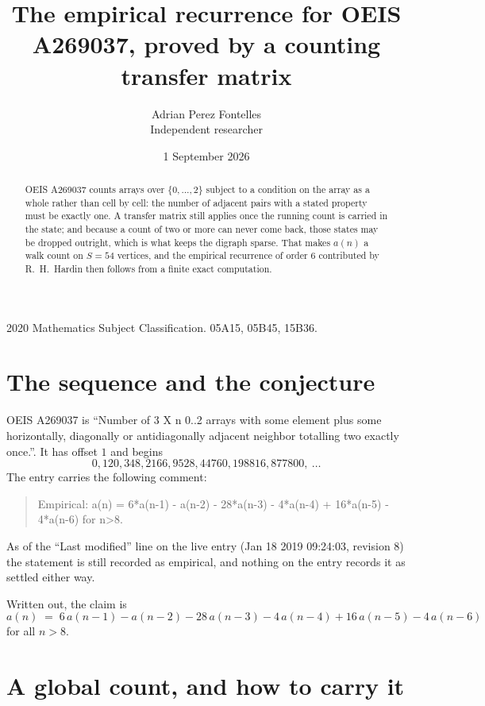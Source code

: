 \documentclass[11pt,a4paper]{article}
\title{The empirical recurrence for OEIS A269037, proved by a counting transfer matrix}
\author{Adrian Perez Fontelles\\ \small Independent researcher}
\date{1 September 2026}
\theoremstyle{plain}
\theoremstyle{definition}
\begin{document}
\maketitle

\begin{abstract}
OEIS A269037 counts arrays over $\{0,\dots,2\}$ subject to a condition on the array as a
whole rather than cell by cell: the number of adjacent pairs with a stated property must be
exactly one. A transfer matrix still applies once the running count is carried in the state; and
because a count of two or more can never come back, those states may be dropped outright,
which is what keeps the digraph sparse. That makes $a(n)$ a walk count on $S=54$ vertices,
and the empirical recurrence of order $6$ contributed by R.~H.~Hardin then follows from
a finite exact computation.
\end{abstract}

\noindent\small 2020 Mathematics Subject Classification. 05A15, 05B45, 15B36.\normalsize

\section{The sequence and the conjecture}

OEIS A269037 is ``Number of 3 X n 0..2 arrays with some element plus some horizontally, diagonally or antidiagonally adjacent neighbor totalling two exactly once.''. It has offset $1$ and begins
\[
0, 120, 348, 2166, 9528, 44760, 198816, 877800,\ \dots
\]
The entry carries the following comment:
\begin{quote}\small
Empirical: a(n) = 6*a(n-1) - a(n-2) - 28*a(n-3) - 4*a(n-4) + 16*a(n-5) - 4*a(n-6) for n>8.
\end{quote}
As of the ``Last modified'' line on the live entry (Jan 18 2019 09:24:03, revision 8) the statement is
still recorded as empirical, and nothing on the entry records it as settled either way.

Written out, the claim is
\begin{equation}\label{eq:conj}
a(n)\;=\;6\,a(n-1) - a(n-2) - 28\,a(n-3) - 4\,a(n-4) + 16\,a(n-5) - 4\,a(n-6)
\end{equation}
for all $n>8$.

\section{A global count, and how to carry it}
\end{document}
